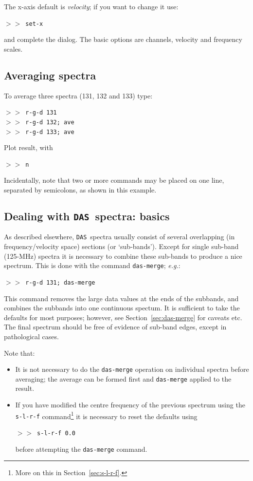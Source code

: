 \documentclass[11pt,twoside]{article}
\newcommand{\eg}{{\it e.g.}}
\newcommand{\SPECX}{{\tt SPECX}}
\newcommand{\das}{{\tt DAS}}
\newcommand{\margnote}[1]
{\marginpar{({\it{\ref{#1}}})}}
\newcommand{\SP}{{$>\!>$}}
\begin{document}
The x-axis default is {\it{velocity}}; if you want to change it
use\margnote{sec:set-x}:

\SP\ {\tt{set-x}}

and complete the dialog. The basic options are channels, velocity and
frequency scales.


\subsection{Averaging spectra}
To average\margnote{sec:specx_8.2} three spectra (131, 132 and 133) type:

\SP\ {\tt{r-g-d 131}}\\
\SP\ {\tt{r-g-d 132; ave}}\\
\SP\ {\tt{r-g-d 133; ave}}

Plot result, with 

\SP\ {\tt{n}}

Incidentally, note that two or more commands may be placed on one
line, separated by semicolons, as shown in this example.

\subsection{Dealing with \das\ spectra: basics}
\label{sec:subbands}
As described elsewhere, 
\das\ spectra usually
\margnote{sec:das-merge} 
consist of several overlapping (in frequency/velocity space) sections
(or `sub-bands'). Except for single sub-band (125-MHz) spectra it is
necessary to combine these sub-bands to produce a nice spectrum. This
is done with the command {\tt{das-merge}}; \eg :

\SP\ {\tt r-g-d 131; das-merge}

This command removes the large data values at the ends
of the subbands, and combines the subbands into one continuous
spectum.  It is sufficient to take the defaults for most purposes;
however, see Section~\ref{sec:das-merge} for caveats etc.  The final
spectrum should be free of evidence of sub-band edges, except in
pathological cases.


\reversemarginpar
Note that:
\begin{itemize}
\item
It is not necessary to do the {\tt das-merge} operation on individual
spectra before averaging; the average can be formed first and 
{\tt{das-merge}} applied to the result.
\item
If you have modified the centre frequency of the previous spectrum
\margnote{sec:s-l-r-f}
using the {\tt{s-l-r-f}} command\footnote{More on this in
Section~\ref{sec:s-l-r-f}.} it is necessary to reset the defaults
using

\SP\ {\tt{s-l-r-f 0.0}}

before attempting the {\tt{das-merge}} command. 
\end{itemize}
\end{document}
